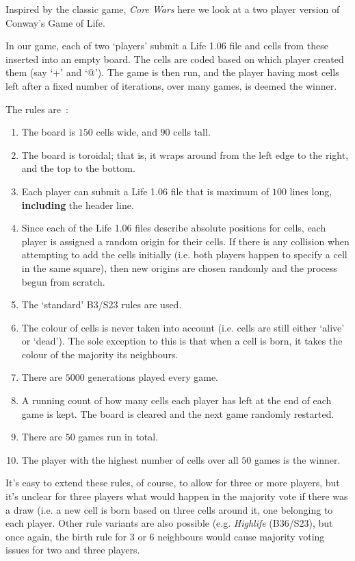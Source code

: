 
Inspired by the classic game, {\it Core Wars}
here we look at a two player version of Conway's 
Game of Life.

In our game, each of two `players' submit
a Life 1.06 file and cells from these inserted into an
empty board. The cells are coded based on which player
created them (say `+' and `@'). The game is then run, and
the player having most cells left after a fixed number of
iterations, over many games, is deemed the winner.

The rules are~:
\begin{enumerate}
\item The board is $150$ cells wide, and $90$ cells tall.
\item The board is toroidal; that is, it wraps around from the left
edge to the right, and the top to the bottom.
\item Each player can submit a Life 1.06 file that is maximum of $100$
lines long, {\bf including} the header line.
\item Since each of the Life 1.06 files describe absolute positions
for cells, each player is assigned a random origin for their cells. 
If there is any collision when attempting to add the cells initially
(i.e. both players happen to specify a cell in the same square),
then new origins are chosen randomly and the process begun from scratch.
\item The `standard' B3/S23 rules are used.
\item The colour of cells is never taken into account (i.e. cells are still either `alive' or `dead').
The sole exception to this is that when a cell is born, it takes the colour of the majority its
neighbours.
\item There are $5000$ generations played every game.
\item A running count of how many cells each player has left at the end
of each game is kept. The board is cleared and the next game randomly
restarted.
\item There are $50$ games run in total.
\item The player with the highest number of cells over all $50$ games
is the winner.
\end{enumerate}

It's easy to extend these rules, of course, to allow for three or more players,
but it's unclear for three players what would happen in the majority vote if there
was a draw (i.e. a new cell is born based on three cells around it, one belonging
to each player.  Other rule variants are also possible
(e.g. {\it Highlife} (B36/S23),
but once again, the birth rule for $3$ or $6$ neighbours would cause majority
voting issues for two and three players.


